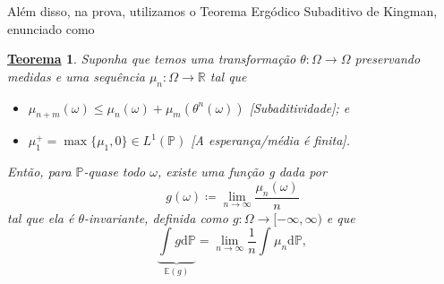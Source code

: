 \documentclass[12pt, a4paper]{article}
\newtheorem*{theorem*}{\underline{Teorema}}
\theoremstyle{definition}
\begin{document}
Além disso, na prova, utilizamos o Teorema Ergódico Subaditivo de Kingman, enunciado como
\begin{theorem*}
	Suponha que temos uma transformação \(\theta :\Omega \rightarrow \Omega \) preservando medidas e uma sequência \(\mu_{n}:\Omega \rightarrow \mathbb{R} \) tal que
	\begin{itemize}
		\item[1)] \(\mu_{n+m}(\omega ) \leq \mu_{n}(\omega )+\mu_{m}(\theta^{n}(\omega) )\) [Subaditividade]; e
		\item[2)] \(\mu_{1}^{+} = \max\limits \{\mu_{1}, 0\}\in L^{1}(\mathbb{P})\) [A esperança/média é finita].
	\end{itemize}
	Então, para \(\mathbb{P}\)-quase todo \(\omega \), existe uma função g dada por
	\[
		g(\omega )\coloneqq \lim_{n\to \infty}\frac{\mu_{n}(\omega )}{n}
	\]
	tal que ela é \(\theta\)-invariante, definida como \(g:\Omega \rightarrow [-\infty, \infty)\) e que
	\[
		\underbrace{\int_{}^{}g  \mathrm{d}\mathbb{P}}_{\mathbb{E}(g)} = \lim_{n\to \infty} \frac{1}{n}\int_{}^{}\mu_{n} \mathrm{d}\mathbb{P},
	\]
\end{theorem*}
\end{document}
